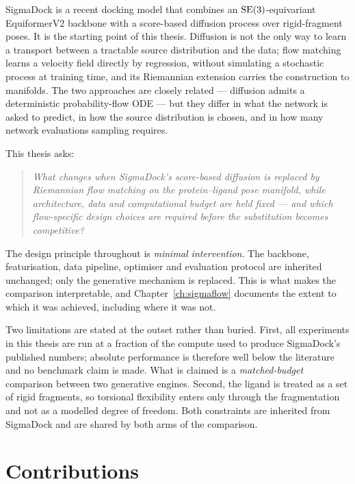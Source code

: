 SigmaDock \citep{prat2026sigmadock} is a recent docking model that combines an
$\mathrm{SE}(3)$-equivariant EquiformerV2 backbone \citep{liao2024equiformerv2} with
a score-based diffusion process over rigid-fragment poses. It is the starting
point of this thesis. Diffusion is not the only way to learn a transport
between a tractable source distribution and the data; flow matching
\citep{lipman2023flow} learns a velocity field directly by regression, without
simulating a stochastic process at training time, and its Riemannian extension
\citep{chen2024riemannian} carries the construction to manifolds. The two
approaches are closely related --- diffusion admits a deterministic
probability-flow ODE \citep{song2021sde} --- but they differ in what the
network is asked to predict, in how the source distribution is chosen, and in
how many network evaluations sampling requires.

This thesis asks:

\begin{quote}
\itshape
What changes when SigmaDock's score-based diffusion is replaced by Riemannian
flow matching on the protein--ligand pose manifold, while architecture, data
and computational budget are held fixed --- and which flow-specific design
choices are required before the substitution becomes competitive?
\end{quote}

The design principle throughout is \emph{minimal intervention}. The backbone,
featurisation, data pipeline, optimiser and evaluation protocol are inherited
unchanged; only the generative mechanism is replaced. This is what makes the
comparison interpretable, and Chapter~\ref{ch:sigmaflow} documents the extent
to which it was achieved, including where it was not.

Two limitations are stated at the outset rather than buried. First, all
experiments in this thesis are run at a fraction of the compute used to
produce SigmaDock's published numbers; absolute performance is therefore well
below the literature and no benchmark claim is made. What is claimed is a
\emph{matched-budget} comparison between two generative engines. Second, the
ligand is treated as a set of rigid fragments, so torsional flexibility enters
only through the fragmentation and not as a modelled degree of freedom. Both
constraints are inherited from SigmaDock and are shared by both arms of the
comparison.

\section{Contributions}
\label{sec:contributions}

